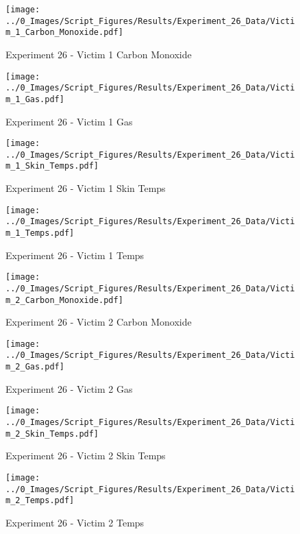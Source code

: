	\clearpage

	\begin{figure}[H]
		\centering
		\texttt{[image: ../0\_Images/Script\_Figures/Results/Experiment\_26\_Data/Victim\_1\_Carbon\_Monoxide.pdf]}
		\caption[]{Experiment 26 - Victim 1 Carbon Monoxide}
	\end{figure}
 

	\begin{figure}[H]
		\centering
		\texttt{[image: ../0\_Images/Script\_Figures/Results/Experiment\_26\_Data/Victim\_1\_Gas.pdf]}
		\caption[]{Experiment 26 - Victim 1 Gas}
	\end{figure}
 
	\clearpage

	\begin{figure}[H]
		\centering
		\texttt{[image: ../0\_Images/Script\_Figures/Results/Experiment\_26\_Data/Victim\_1\_Skin\_Temps.pdf]}
		\caption[]{Experiment 26 - Victim 1 Skin Temps}
	\end{figure}
 

	\begin{figure}[H]
		\centering
		\texttt{[image: ../0\_Images/Script\_Figures/Results/Experiment\_26\_Data/Victim\_1\_Temps.pdf]}
		\caption[]{Experiment 26 - Victim 1 Temps}
	\end{figure}
 
	\clearpage

	\begin{figure}[H]
		\centering
		\texttt{[image: ../0\_Images/Script\_Figures/Results/Experiment\_26\_Data/Victim\_2\_Carbon\_Monoxide.pdf]}
		\caption[]{Experiment 26 - Victim 2 Carbon Monoxide}
	\end{figure}
 

	\begin{figure}[H]
		\centering
		\texttt{[image: ../0\_Images/Script\_Figures/Results/Experiment\_26\_Data/Victim\_2\_Gas.pdf]}
		\caption[]{Experiment 26 - Victim 2 Gas}
	\end{figure}
 
	\clearpage

	\begin{figure}[H]
		\centering
		\texttt{[image: ../0\_Images/Script\_Figures/Results/Experiment\_26\_Data/Victim\_2\_Skin\_Temps.pdf]}
		\caption[]{Experiment 26 - Victim 2 Skin Temps}
	\end{figure}
 

	\begin{figure}[H]
		\centering
		\texttt{[image: ../0\_Images/Script\_Figures/Results/Experiment\_26\_Data/Victim\_2\_Temps.pdf]}
		\caption[]{Experiment 26 - Victim 2 Temps}
	\end{figure}
 
